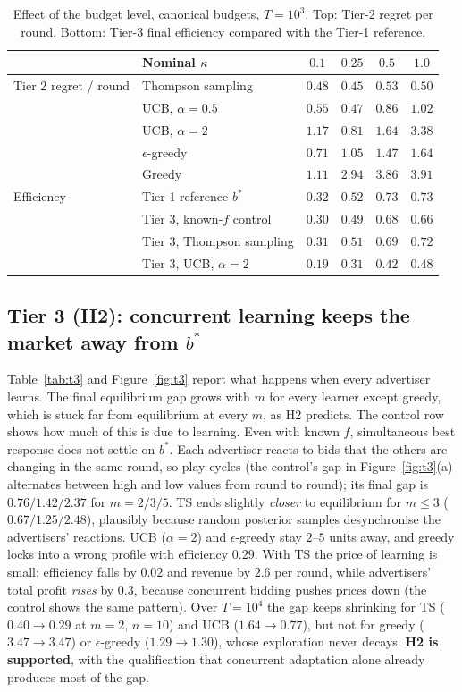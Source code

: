 \documentclass{article}
\theoremstyle{definition}
\begin{document}
\begin{table}[t]
\caption{Effect of the budget level, canonical budgets, $T=10^3$. Top: Tier-2 regret per round. Bottom:
Tier-3 final efficiency compared with the Tier-1 reference.}
\label{tab:kappa}
\centering\small
\begin{tabular}{@{}llcccc@{}}
\toprule
 & Nominal $\kappa$ & $0.1$ & $0.25$ & $0.5$ & $1.0$\\
\midrule
Tier 2 regret / round & Thompson sampling & $0.48$ & $0.45$ & $0.53$ & $0.50$\\
 & UCB, $\alpha=0.5$ & $0.55$ & $0.47$ & $0.86$ & $1.02$\\
 & UCB, $\alpha=2$ & $1.17$ & $0.81$ & $1.64$ & $3.38$\\
 & $\epsilon$-greedy & $0.71$ & $1.05$ & $1.47$ & $1.64$\\
 & Greedy & $1.11$ & $2.94$ & $3.86$ & $3.91$\\
\midrule
Efficiency & Tier-1 reference $b^\ast$ & $0.32$ & $0.52$ & $0.73$ & $0.73$\\
 & Tier 3, known-$f$ control & $0.30$ & $0.49$ & $0.68$ & $0.66$\\
 & Tier 3, Thompson sampling & $0.31$ & $0.51$ & $0.69$ & $0.72$\\
 & Tier 3, UCB, $\alpha=2$ & $0.19$ & $0.31$ & $0.42$ & $0.48$\\
\bottomrule
\end{tabular}
\end{table}

\subsection{Tier 3 (H2): concurrent learning keeps the market away from $b^\ast$}
Table~\ref{tab:t3} and Figure~\ref{fig:t3} report what happens when every advertiser learns. The final
equilibrium gap grows with $m$ for every learner except greedy, which is stuck far from equilibrium at
every $m$, as H2 predicts. The control row shows how much of this is due to learning. Even with known $f$,
simultaneous best response does not settle on $b^\ast$. Each advertiser reacts to bids that the others are
changing in the same round, so play cycles (the control's gap in Figure~\ref{fig:t3}(a) alternates between
high and low values from round to round); its final gap is $0.76/1.42/2.37$ for $m=2/3/5$. TS ends
slightly \emph{closer} to equilibrium for $m\le3$ ($0.67/1.25/2.48$), plausibly because random posterior
samples desynchronise the advertisers' reactions. UCB ($\alpha=2$) and $\epsilon$-greedy stay $2$--$5$ units
away, and greedy locks into a wrong profile with efficiency $0.29$. With TS the price of learning is small:
efficiency falls by $0.02$ and revenue by $2.6$ per round, while advertisers' total profit \emph{rises} by
$0.3$, because concurrent bidding pushes prices down (the control shows the same pattern). Over
$T=10^4$ the gap keeps shrinking for TS ($0.40\to0.29$ at $m=2$, $n=10$) and UCB ($1.64\to0.77$), but not for
greedy ($3.47\to3.47$) or $\epsilon$-greedy ($1.29\to1.30$), whose exploration never decays.
\textbf{H2 is supported}, with the qualification that concurrent adaptation alone already produces most of
the gap.
\end{document}
